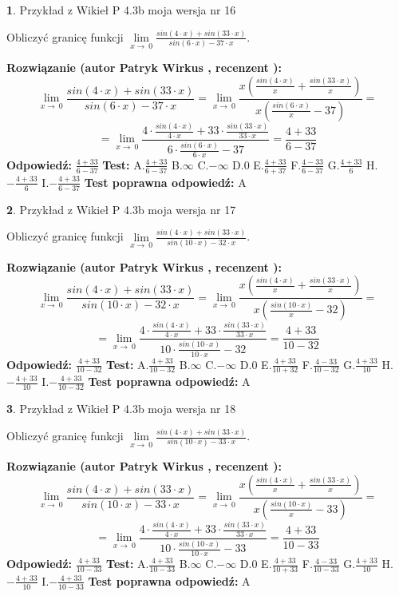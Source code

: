 \documentclass[12pt, a4paper]{article}
\theoremstyle{definition} %
\newtheorem{zad}{}
\newcommand{\zadStart}[1]{\begin{zad}#1\newline}
\newcommand{\zadStop}{\end{zad}}
\newcommand{\rozwStart}[2]{\noindent \textbf{Rozwiązanie (autor #1 , recenzent #2): }\newline}
\newcommand{\rozwStop}{\newline}
\newcommand{\odpStart}{\noindent \textbf{Odpowiedź:}\newline}
\newcommand{\odpStop}{\newline}
\newcommand{\testStart}{\noindent \textbf{Test:}\newline}
\newcommand{\testStop}{\newline}
\newcommand{\kluczStart}{\noindent \textbf{Test poprawna odpowiedź:}\newline}
\newcommand{\kluczStop}{\newline}
\begin{document}
\zadStart{Przykład z Wikieł P 4.3b moja wersja nr 16}


Obliczyć granicę funkcji $\lim\limits_{x\to\ 0}\frac{sin(4 \cdot x)+sin(33 \cdot x)}{sin(6 \cdot x)-37 \cdot x}$.
\zadStop
\rozwStart{Patryk Wirkus}{}
$$\lim\limits_{x\to\ 0}\frac{sin(4 \cdot x)+sin(33 \cdot x)}{sin(6 \cdot x)-37 \cdot x}=\lim\limits_{x\to\ 0}\frac{x(\frac{sin(4 \cdot x)}{x}+\frac{sin(33 \cdot x)}{x})}{x(\frac{sin(6 \cdot x)}{x}-37)}=$$
$$=\lim\limits_{x\to\ 0}\frac{4 \cdot \frac{sin(4 \cdot x)}{4 \cdot x}+33 \cdot \frac{sin(33 \cdot x)}{33 \cdot x}}{6 \cdot \frac{sin(6 \cdot x)}{6 \cdot x}-37}=\frac{4+33}{6-37}$$
\rozwStop
\odpStart
$\frac{4+33}{6-37}$
\odpStop
\testStart
A.$\frac{4+33}{6-37}$
B.$\infty$
C.$-\infty$
D.$0$
E.$\frac{4+33}{6+37}$
F.$\frac{4-33}{6-37}$
G.$\frac{4+33}{6}$
H.$-\frac{4+33}{6}$
I.$-\frac{4+33}{6-37}$
\testStop
\kluczStart
A
\kluczStop



\zadStart{Przykład z Wikieł P 4.3b moja wersja nr 17}


Obliczyć granicę funkcji $\lim\limits_{x\to\ 0}\frac{sin(4 \cdot x)+sin(33 \cdot x)}{sin(10 \cdot x)-32 \cdot x}$.
\zadStop
\rozwStart{Patryk Wirkus}{}
$$\lim\limits_{x\to\ 0}\frac{sin(4 \cdot x)+sin(33 \cdot x)}{sin(10 \cdot x)-32 \cdot x}=\lim\limits_{x\to\ 0}\frac{x(\frac{sin(4 \cdot x)}{x}+\frac{sin(33 \cdot x)}{x})}{x(\frac{sin(10 \cdot x)}{x}-32)}=$$
$$=\lim\limits_{x\to\ 0}\frac{4 \cdot \frac{sin(4 \cdot x)}{4 \cdot x}+33 \cdot \frac{sin(33 \cdot x)}{33 \cdot x}}{10 \cdot \frac{sin(10 \cdot x)}{10 \cdot x}-32}=\frac{4+33}{10-32}$$
\rozwStop
\odpStart
$\frac{4+33}{10-32}$
\odpStop
\testStart
A.$\frac{4+33}{10-32}$
B.$\infty$
C.$-\infty$
D.$0$
E.$\frac{4+33}{10+32}$
F.$\frac{4-33}{10-32}$
G.$\frac{4+33}{10}$
H.$-\frac{4+33}{10}$
I.$-\frac{4+33}{10-32}$
\testStop
\kluczStart
A
\kluczStop



\zadStart{Przykład z Wikieł P 4.3b moja wersja nr 18}


Obliczyć granicę funkcji $\lim\limits_{x\to\ 0}\frac{sin(4 \cdot x)+sin(33 \cdot x)}{sin(10 \cdot x)-33 \cdot x}$.
\zadStop
\rozwStart{Patryk Wirkus}{}
$$\lim\limits_{x\to\ 0}\frac{sin(4 \cdot x)+sin(33 \cdot x)}{sin(10 \cdot x)-33 \cdot x}=\lim\limits_{x\to\ 0}\frac{x(\frac{sin(4 \cdot x)}{x}+\frac{sin(33 \cdot x)}{x})}{x(\frac{sin(10 \cdot x)}{x}-33)}=$$
$$=\lim\limits_{x\to\ 0}\frac{4 \cdot \frac{sin(4 \cdot x)}{4 \cdot x}+33 \cdot \frac{sin(33 \cdot x)}{33 \cdot x}}{10 \cdot \frac{sin(10 \cdot x)}{10 \cdot x}-33}=\frac{4+33}{10-33}$$
\rozwStop
\odpStart
$\frac{4+33}{10-33}$
\odpStop
\testStart
A.$\frac{4+33}{10-33}$
B.$\infty$
C.$-\infty$
D.$0$
E.$\frac{4+33}{10+33}$
F.$\frac{4-33}{10-33}$
G.$\frac{4+33}{10}$
H.$-\frac{4+33}{10}$
I.$-\frac{4+33}{10-33}$
\testStop
\kluczStart
A
\kluczStop
\end{document}
